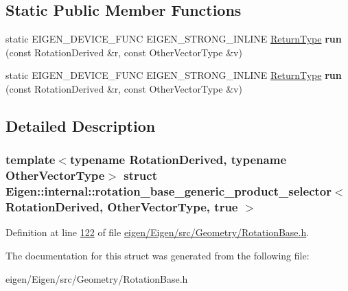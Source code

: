 \subsection*{Static Public Member Functions}
\begin{DoxyCompactItemize}
\item 
\mbox{\label{struct_eigen_1_1internal_1_1rotation__base__generic__product__selector_3_01_rotation_derived_00_945228ddac360fee065f79280b8a793b_acfd1798f465474344d93478b104ff21e}} 
static E\+I\+G\+E\+N\+\_\+\+D\+E\+V\+I\+C\+E\+\_\+\+F\+U\+NC E\+I\+G\+E\+N\+\_\+\+S\+T\+R\+O\+N\+G\+\_\+\+I\+N\+L\+I\+NE \hyperlink{group___core___module_class_eigen_1_1_matrix}{Return\+Type} {\bfseries run} (const Rotation\+Derived \&r, const Other\+Vector\+Type \&v)
\item 
\mbox{\label{struct_eigen_1_1internal_1_1rotation__base__generic__product__selector_3_01_rotation_derived_00_945228ddac360fee065f79280b8a793b_acfd1798f465474344d93478b104ff21e}} 
static E\+I\+G\+E\+N\+\_\+\+D\+E\+V\+I\+C\+E\+\_\+\+F\+U\+NC E\+I\+G\+E\+N\+\_\+\+S\+T\+R\+O\+N\+G\+\_\+\+I\+N\+L\+I\+NE \hyperlink{group___core___module_class_eigen_1_1_matrix}{Return\+Type} {\bfseries run} (const Rotation\+Derived \&r, const Other\+Vector\+Type \&v)
\end{DoxyCompactItemize}


\subsection{Detailed Description}
\subsubsection*{template$<$typename Rotation\+Derived, typename Other\+Vector\+Type$>$\newline
struct Eigen\+::internal\+::rotation\+\_\+base\+\_\+generic\+\_\+product\+\_\+selector$<$ Rotation\+Derived, Other\+Vector\+Type, true $>$}



Definition at line \hyperlink{eigen_2_eigen_2src_2_geometry_2_rotation_base_8h_source_l00122}{122} of file \hyperlink{eigen_2_eigen_2src_2_geometry_2_rotation_base_8h_source}{eigen/\+Eigen/src/\+Geometry/\+Rotation\+Base.\+h}.



The documentation for this struct was generated from the following file\+:\begin{DoxyCompactItemize}
\item 
eigen/\+Eigen/src/\+Geometry/\+Rotation\+Base.\+h\end{DoxyCompactItemize}
